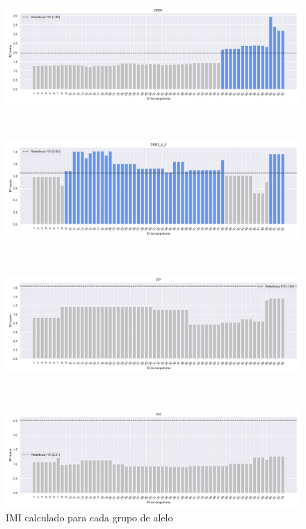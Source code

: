 \begin{figure}[H]
    \centering
    \begin{minipage}{0.9\textwidth}
        \centering
        \includegraphics[width=\textwidth]{figuras/plot_imuno_IMscore_DRB1.png}
    \end{minipage} \\[1ex]%
    \begin{minipage}{0.9\textwidth}
        \centering
        \includegraphics[width=\textwidth]{figuras/plot_imuno_IMscore_DRB3_4_5.png}
    \end{minipage} \\[1ex] %
    \begin{minipage}{0.9\textwidth}
        \centering
        \includegraphics[width=\textwidth]{figuras/plot_imuno_IMscore_DP.png}
    \end{minipage} \\[1ex]%
    \begin{minipage}{0.9\textwidth}
        \centering
        \includegraphics[width=\textwidth]{figuras/plot_imuno_IMscore_DQ.png}
    \end{minipage} 
    \caption{IMI calculado para cada grupo de alelo}
\end{figure}


